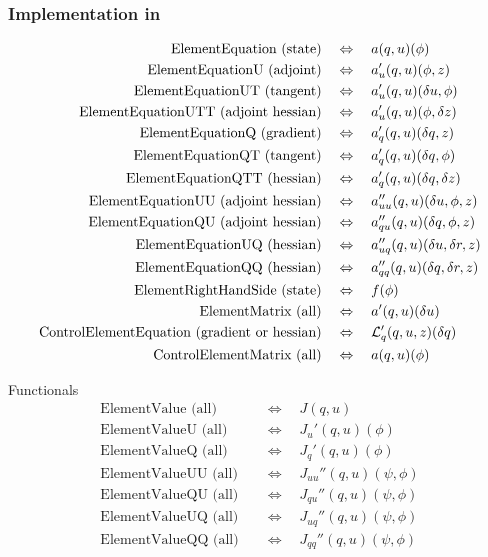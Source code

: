\subsubsection{Implementation in \dope{}}

\begin{align*}
\text{ElementEquation (state)} \quad &\Leftrightarrow \quad a(q,u)(\phi) \\
\text{ElementEquationU (adjoint)} \quad 
&\Leftrightarrow \quad a_u'(q,u)(\phi, z) \\ 
\text{ElementEquationUT (tangent)} \quad 
&\Leftrightarrow \quad a_u'(q,u)(\delta u, \phi) \\
\text{ElementEquationUTT (adjoint hessian)} \quad 
&\Leftrightarrow \quad  a_u'(q,u)(\phi, \delta z) \\
\text{ElementEquationQ (gradient)} \quad 
&\Leftrightarrow \quad a_q'(q,u)(\delta q,z) \\
\text{ElementEquationQT (tangent)} \quad 
&\Leftrightarrow \quad a_q'(q,u)(\delta q, \phi) \\
\text{ElementEquationQTT (hessian)} \quad 
&\Leftrightarrow \quad a_{q}'(q,u)(\delta q,\delta z) \\
\text{ElementEquationUU (adjoint hessian)} \quad 
&\Leftrightarrow \quad a_{uu}''(q,u)(\delta u, \phi, z) \\
\text{ElementEquationQU (adjoint hessian)} \quad 
&\Leftrightarrow \quad a_{qu}''(q,u)(\delta q, \phi, z) \\
\text{ElementEquationUQ (hessian)} \quad 
&\Leftrightarrow \quad a_{uq}''(q,u)(\delta u, \delta r, z)\\
\text{ElementEquationQQ (hessian)} \quad 
&\Leftrightarrow \quad a_{qq}''(q,u)(\delta q, \delta r, z)\\
\text{ElementRightHandSide (state)} \quad 
&\Leftrightarrow \quad f(\phi ) \\
\text{ElementMatrix (all)} \quad 
&\Leftrightarrow \quad a'(q,u)(\delta u) \\
\text{ControlElementEquation (gradient or hessian)} \quad 
&\Leftrightarrow \quad {\cal L}_q' (q,u,z)(\delta q) \\
\text{ControlElementMatrix (all)} \quad 
&\Leftrightarrow \quad a(q,u)(\phi)
\end{align*}

Functionals
\begin{align*}
\text{ElementValue (all)} \quad  & \Leftrightarrow \quad J(q,u) \\
\text{ElementValueU (all)} \quad  & \Leftrightarrow \quad J_u'(q,u)(\phi) \\
\text{ElementValueQ (all)} \quad  & \Leftrightarrow \quad J_q'(q,u)(\phi) \\
\text{ElementValueUU (all)} \quad & \Leftrightarrow \quad J_{uu}''(q,u)(\psi, \phi) \\
\text{ElementValueQU (all)} \quad & \Leftrightarrow \quad J_{qu}''(q,u)(\psi, \phi) \\
\text{ElementValueUQ (all)} \quad & \Leftrightarrow \quad J_{uq}''(q,u)(\psi, \phi) \\
\text{ElementValueQQ (all)} \quad & \Leftrightarrow \quad J_{qq}''(q,u)(\psi, \phi) \\
\end{align*}


